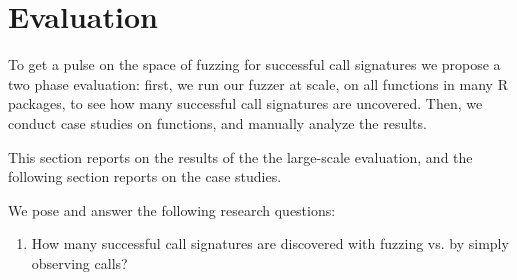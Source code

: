 \section{Evaluation}

To get a pulse on the space of fuzzing for successful call signatures we propose a two phase evaluation: first, we run our fuzzer at scale, on all functions in many R packages, to see how many successful call signatures are uncovered.
Then, we conduct case studies on \numFnsCaseStudy functions, and manually analyze the results.

This section reports on the results of the the large-scale evaluation, and the following section reports on the case studies.

We pose and answer the following research questions:

\begin{enumerate}
    \item How many successful call signatures are discovered with fuzzing vs. by simply observing calls?
\end{enumerate}

